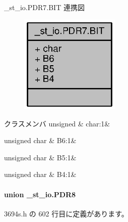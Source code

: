 \+\_\+st\+\_\+io.\+P\+D\+R7.\+B\+I\+T 連携図
\nopagebreak
\begin{figure}[H]
\begin{center}
\leavevmode
\includegraphics[width=135pt]{d1/d22/struct__st__io_8PDR7_8BIT__coll__graph}
\end{center}
\end{figure}
\begin{DoxyFields}{クラスメンバ}
unsigned\label{3694s_8h_aa87deb01c5f539e6bda34829c8ef2368}
&
char\+:1&
\\
\hline

unsigned char\label{3694s_8h_a68b1f1cc15d8987eafe633c9488bdc05}
&
B6\+:1&
\\
\hline

unsigned char\label{3694s_8h_a2a1ab298edf0162a3305e599b47cbeee}
&
B5\+:1&
\\
\hline

unsigned char\label{3694s_8h_ad5d4cc7b09d1843517acc9361f8f665e}
&
B4\+:1&
\\
\hline

\end{DoxyFields}
\label{union__st__io_8PDR8}
\paragraph{union \+\_\+st\+\_\+io.\+P\+D\+R8}


 3694s.\+h の 602 行目に定義があります。



